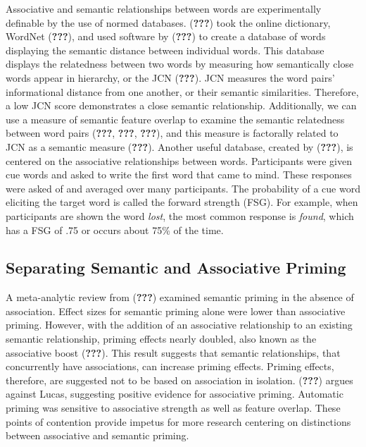 \documentclass[english,man]{apa6}
\theoremstyle{definition}
\theoremstyle{definition}
\theoremstyle{definition}
\theoremstyle{remark}
\begin{document}
Associative and semantic relationships between words are experimentally
definable by the use of normed databases. ({\textbf{???}}) took the
online dictionary, WordNet ({\textbf{???}}), and used software by
({\textbf{???}}) to create a database of words displaying the semantic
distance between individual words. This database displays the
relatedness between two words by measuring how semantically close words
appear in hierarchy, or the JCN ({\textbf{???}}). JCN measures the word
pairs' informational distance from one another, or their semantic
similarities. Therefore, a low JCN score demonstrates a close semantic
relationship. Additionally, we can use a measure of semantic feature
overlap to examine the semantic relatedness between word pairs
({\textbf{???}}, {\textbf{???}}, {\textbf{???}}), and this measure is
factorally related to JCN as a semantic measure ({\textbf{???}}).
Another useful database, created by ({\textbf{???}}), is centered on the
associative relationships between words. Participants were given cue
words and asked to write the first word that came to mind. These
responses were asked of and averaged over many participants. The
probability of a cue word eliciting the target word is called the
forward strength (FSG). For example, when participants are shown the
word \emph{lost}, the most common response is \emph{found}, which has a
FSG of .75 or occurs about 75\% of the time.

\subsection{Separating Semantic and Associative
Priming}\label{separating-semantic-and-associative-priming}

A meta-analytic review from ({\textbf{???}}) examined semantic priming
in the absence of association. Effect sizes for semantic priming alone
were lower than associative priming. However, with the addition of an
associative relationship to an existing semantic relationship, priming
effects nearly doubled, also known as the associative boost
({\textbf{???}}). This result suggests that semantic relationships, that
concurrently have associations, can increase priming effects. Priming
effects, therefore, are suggested not to be based on association in
isolation. ({\textbf{???}}) argues against Lucas, suggesting positive
evidence for associative priming. Automatic priming was sensitive to
associative strength as well as feature overlap. These points of
contention provide impetus for more research centering on distinctions
between associative and semantic priming.
\end{document}

